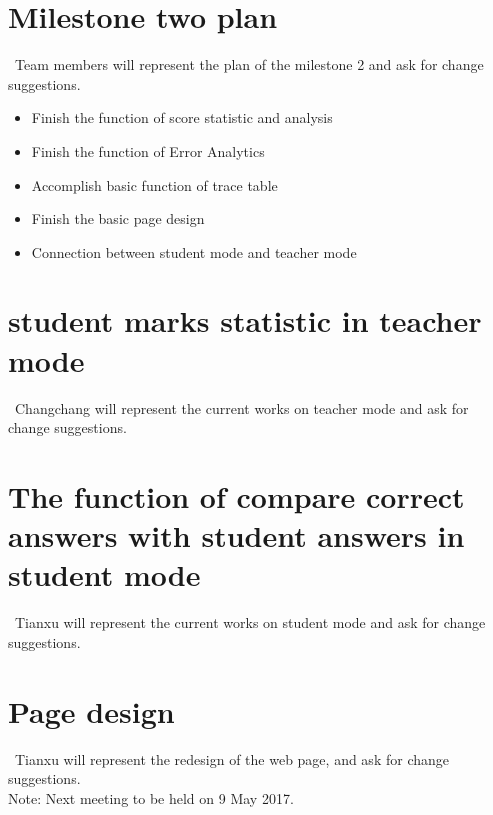 \documentclass[11pt, a4paper]{article}
\begin{document}
\section{Milestone two plan}
\ Team members will  represent the plan of the milestone 2 and ask for change suggestions. \\
\begin {itemize} 
\item Finish the function of score statistic and analysis
\item Finish the function of Error Analytics
\item Accomplish basic function of trace table
\item Finish the basic page design
\item Connection between student mode and teacher mode
\end {itemize}

\section{student marks statistic in teacher mode}
\ Changchang will represent the current works on teacher mode and ask for change suggestions. \\

\section{The function of compare correct answers with student answers in student mode }
\ Tianxu will represent the current works on student mode and ask for change suggestions.\\

\section{Page design}
\ Tianxu will represent the redesign of the web page, and ask for change suggestions.\\


\vspace*{10pt}
\noindent Note: Next meeting to be held on 9 May 2017.
\end{document}
